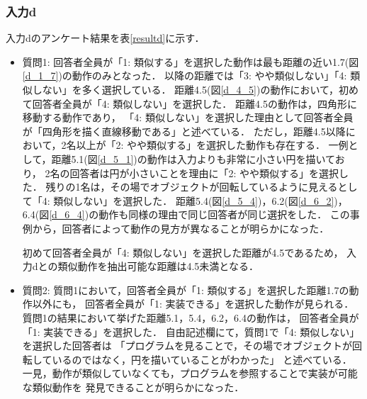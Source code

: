\documentclass[11pt]{jreport}
\begin{document}
\subsubsection{入力d}
入力dのアンケート結果を表\ref{resultd}に示す．

\begin{itemize}
    \item 質問1: 回答者全員が「1: 類似する」を選択した動作は最も距離の近い1.7(図\ref{d_1_7})の動作のみとなった．
    以降の距離では「3: やや類似しない」「4: 類似しない」を多く選択している．
    距離4.5(図\ref{d_4_5})の動作において，初めて回答者全員が「4: 類似しない」を選択した．
    距離4.5の動作は，四角形に移動する動作であり，
    「4: 類似しない」を選択した理由として回答者全員が「四角形を描く直線移動である」と述べている．
    ただし，距離4.5以降において，2名以上が「2: やや類似する」を選択した動作も存在する．
    一例として，距離5.1(図\ref{d_5_1})の動作は入力よりも非常に小さい円を描いており，
    2名の回答者は円が小さいことを理由に「2: やや類似する」を選択した．
    残りの1名は，その場でオブジェクトが回転しているように見えるとして「4: 類似しない」を選択した．
    距離5.4(図\ref{d_5_4})，6.2(図\ref{d_6_2})，6.4(図\ref{d_6_4})の動作も同様の理由で同じ回答者が同じ選択をした．
    この事例から，回答者によって動作の見方が異なることが明らかになった．
    
    初めて回答者全員が「4: 類似しない」を選択した距離が4.5であるため，
    入力dとの類似動作を抽出可能な距離は4.5未満となる．

    \item 質問2: 質問1において，回答者全員が「1: 類似する」を選択した距離1.7の動作以外にも，
    回答者全員が「1: 実装できる」を選択した動作が見られる．
    質問1の結果において挙げた距離5.1，5.4，6.2，6.4の動作は，
    回答者全員が「1: 実装できる」を選択した．
    自由記述欄にて，質問1で「4: 類似しない」を選択した回答者は
    「プログラムを見ることで，その場でオブジェクトが回転しているのではなく，円を描いていることがわかった」
    と述べている．
    一見，動作が類似していなくても，プログラムを参照することで実装が可能な類似動作を
    発見できることが明らかになった．
\end{itemize}
\end{document}
